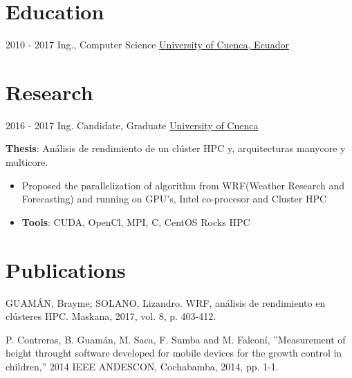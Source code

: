 \documentclass[letterpaper]{twentysecondcv} %
\begin{document}
\makeprofile %

\section{Education}

\begin{twenty} %
	\twentyitem
    	{2010 - 2017}
        {}
        {Ing., Computer Science \textnormal{}}
        {\href{http://www.ucuenca.edu.ec/}{University of Cuenca, Ecuador}}
        {}
	
\end{twenty}

\section{Research}
\begin{twenty}
	\twentyitem
    	{2016 - 2017}
		{}
        {Ing. Candidate, Graduate }
        {\href{http:///www.ucuenca.edu.ec/}{University of Cuenca}}
        {}
        {
       	\textbf{Thesis}: Análisis de rendimiento de un clúster HPC y, arquitecturas manycore y multicore.
        {\begin{itemize}
        \item Proposed the parallelization of algorithm from WRF(Weather Research and Forecasting) and running on GPU’s, Intel co-procesor and Cluster HPC
        \item \textbf{Tools}: CUDA, OpenCl, MPI, C, CentOS Rocks HPC\vspace{2mm}
		\end{itemize}}
        }
\end{twenty}

\section{Publications}

GUAMÁN, Brayme; SOLANO, Lizandro. WRF, análisis de rendimiento en clústeres HPC. Maskana, 2017, vol. 8, p. 403-412. \vspace{2mm}

P. Contreras, B. Guamán, M. Saca, F. Sumba and M. Falconí, ”Measurement of height throught software developed for mobile devices for the growth control in children,” 2014 IEEE ANDESCON, Cochabamba, 2014, pp. 1-1.\vspace{2mm}
\end{document}
